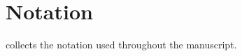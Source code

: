 %

\appendix

\section{Notation}
\label{app:notation}

 collects the notation used throughout the manuscript.



%
%
%
% 
